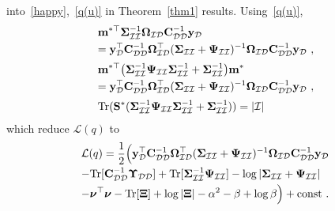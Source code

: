 \documentclass[conference]{IEEEtran}
\begin{document}
	into~\eqref{happy},~\eqref{q(u)} in Theorem~\ref{thm1} results.
	Using~\eqref{q(u)},
	\begin{equation*}
		\begin{array}{l}
			\displaystyle\mathbf{m}^{*\top}\mathbf{\Sigma}_\mathcal{II}^{-1}\mathbf{\Omega}_\mathcal{ID}\mathbf{C}_\mathcal{DD}^{-1}\mathbf{y}_\mathcal{D}\vspace{1mm}\\
			\displaystyle=\mathbf{y}_\mathcal{D}^\top\mathbf{C}_\mathcal{DD}^{-1}\mathbf{\Omega}_\mathcal{ID}^\top(\mathbf{\Sigma}_\mathcal{II}+\mathbf{\Psi}_\mathcal{II})^{-1}\mathbf{\Omega}_\mathcal{ID}\mathbf{C}_\mathcal{DD}^{-1}\mathbf{y}_\mathcal{D}\ , \vspace{2mm}\\
			\displaystyle\mathbf{m}^{*\top}\big(\mathbf{\Sigma}_\mathcal{II}^{-1}\mathbf{\Psi}_\mathcal{II}\mathbf{\Sigma}_\mathcal{II}^{-1}+\mathbf{\Sigma}_\mathcal{II}^{-1}\big)\mathbf{m}^*\vspace{1mm}\\
			\displaystyle=\mathbf{y}_\mathcal{D}^\top\mathbf{C}_\mathcal{DD}^{-1}\mathbf{\Omega}_\mathcal{ID}^\top(\mathbf{\Sigma}_\mathcal{II}+\mathbf{\Psi}_\mathcal{II})^{-1}\mathbf{\Omega}_\mathcal{ID}\mathbf{C}_\mathcal{DD}^{-1}\mathbf{y}_\mathcal{D}\ , \vspace{2mm}\\
			\displaystyle\mathrm{Tr}(\mathbf{S}^*(\mathbf{\Sigma}_\mathcal{II}^{-1}\mathbf{\Psi}_\mathcal{II}\mathbf{\Sigma}_\mathcal{II}^{-1}+\mathbf{\Sigma}_\mathcal{II}^{-1}))=|\mathcal{I}|
		\end{array}
	\end{equation*}
	\vspace{-1mm}
	which reduce $\mathcal{L}(q)$ to\vspace{-1mm}
	\begin{equation}
		\begin{array}{l}
			\mathcal{L}(q)=
			\displaystyle\frac{1}{2}\Big(\mathbf{y}_\mathcal{D}^\top\mathbf{C}_\mathcal{DD}^{-1}\mathbf{\Omega}_\mathcal{ID}^\top(\mathbf{\Sigma}_\mathcal{II}+\mathbf{\Psi}_\mathcal{II})^{-1}\mathbf{\Omega}_\mathcal{ID}\mathbf{C}_\mathcal{DD}^{-1}\mathbf{y}_\mathcal{D}\vspace{1mm}\\
			\displaystyle-\mathrm{Tr}[\mathbf{C}_\mathcal{DD}^{-1}\mathbf{\Upsilon}_\mathcal{DD}]+\mathrm{Tr}[\mathbf{\Sigma}_\mathcal{II}^{-1}\mathbf{\Psi}_\mathcal{II}]-\log|\mathbf{\Sigma}_\mathcal{II}+\mathbf{\Psi}_\mathcal{II}|\vspace{1mm}\\
			\displaystyle-\boldsymbol{\nu}^\top\boldsymbol{\nu}-\mathrm{Tr}[\mathbf{\Xi}]+\log|\mathbf{\Xi}| -\alpha^2-\beta +\log \beta\Big)+\mathrm{const}\ .
		\end{array} \vspace{-1mm}
		\label{eq:TitsiasL(q)}
	\end{equation}
\end{document}
